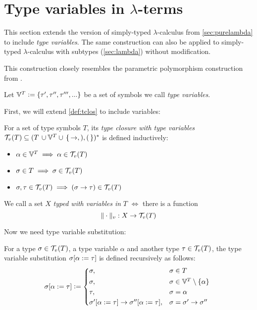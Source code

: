 \documentclass[main.tex]{subfiles}
\begin{document}
\section{Type variables in $\lambda$-terms}
\label{lambda:typevars}

This section extends the version of simply-typed $\lambda$-calculus from
\cref{sec:purelambda} to include \emph{type variables}. The same construction
can also be applied to simply-typed $\lambda$-calculus with subtypes
(\cref{sec:lambda}) without modification.

This construction closely resembles the parametric polymorphism construction
from \cite[chap.~25]{pierce}.

Let $\mathbb{V}^{T} \vcentcolon= \{ \tau', \tau'', \tau''', ... \}$ be a set of symbols we
call \emph{type variables}.

First, we will extend \cref{def:tclos} to include variables:
\begin{defn}
    For a set of type symbols $T$, its \emph{type closure with type variables}
    $\mathcal{T}_v( T ) \subseteq (T \, \cup \mathbb{V}^{T} \cup \,\{\, \rightarrow, ), ( \,\})^*$ is defined
    inductively:

    \begin{itemize}
        \item $\alpha \in \mathbb{V}^{T} \implies \alpha \in \mathcal{T}_v( T )$
        \item $\sigma \in T \implies \sigma \in \mathcal{T}_v( T )$
        \item $\sigma, \tau \in \mathcal{T}_v( T ) \implies (\sigma \rightarrow \tau) \in \mathcal{T}_v( T )$
    \end{itemize}
\end{defn}

\begin{defn}
    We call a set $X$ \emph{typed with variables in} $T$ $\iff$ there is a function
    \[ \|\cdot\|_v : X \rightarrow \mathcal{T}_v( T ) \]
\end{defn}

Now we need type variable substitution:
\begin{defn}
    For a type $\sigma \in \mathcal{T}_v( T )$, a type variable $\alpha$ and another
    type $\tau \in \mathcal{T}_v( T )$, the type variable substitution 
    $\sigma [ \alpha := \tau ]$ is defined recursively as follows:
    \[
        \subst{\sigma}{\alpha}{\tau} \defeq
        \begin{cases*}
            \sigma ,& $\sigma \in T$ \\
            \sigma ,& $\sigma \in \tvars \setminus \{ \alpha \}$ \\
            \tau ,& $\sigma = \alpha$ \\
            \subst{\sigma'}{\alpha}{\tau} \tot \subst{\sigma''}{\alpha}{\tau}
 ,& $\sigma = \sigma' \tot \sigma''$ \\
        \end{cases*}
    \]
\end{defn}
\end{document}

